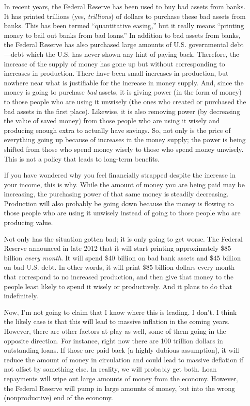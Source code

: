 In recent years, the Federal Reserve has been used to buy bad assets
from banks. It has printed trillions (yes, \textit{trillions}) of
dollars to purchase these bad assets from banks. This has been termed
“quantitative easing,” but it really means “printing money to bail out
banks from bad loans.”  In addition to bad assets from banks, the
Federal Reserve has also purchased large amounts of U.S. governmental
debt—debt which the U.S. has never shown any hint of paying back.
Therefore, the increase of the supply of money has gone up but without
corresponding to increases in production. There have been small
increases in production, but nowhere near what is justifiable for the
increase in money supply. And, since the money is going to purchase
\textit{bad} assets, it is giving power (in the form of money) to those
people who are using it unwisely (the ones who created or purchased the
bad assets in the first place).  Likewise, it is also removing power
(by decreasing the value of saved money) from those people who are
using it wisely and
producing enough extra to actually have
savings.  So, not
only is the price of everything going up because of increases in the
money supply; the power is being shifted from those who spend money
wisely to those who spend money unwisely. This is not a policy that
leads to long-term benefits.

If you have wondered why you feel financially strapped despite the
increase in your income, this is why. While the amount of money you are
being paid may be increasing, the purchasing power of that same money
is steadily decreasing. Production will also probably be going down
because the money is flowing to those people who are using it unwisely
instead of going to those people who are producing value.

Not only has the situation gotten bad; it is only going to get worse.
The Federal Reserve announced in late 2012 that it will start printing
approximately \$85 billion \textit{every month}. It will spend \$40
billion on bad bank assets and \$45 billion on bad U.S. debt. In other
words, it will print \$85 billion dollars every month that correspond
to no increased production, and then give that money to the people
least likely to spend it wisely or productively. And it plans to do
that indefinitely.

Now, I’m not going to claim that I know where this is leading. I don’t.
I think the likely case is that this will lead to massive inflation in
the coming years. 
However, there are other factors at play as well, some of them going in
the opposite direction.  For instance, right now there are 100 trillion
dollars in outstanding loans. If those are paid back (a highly dubious
assumption), it will reduce the amount of money in circulation and could
lead to massive deflation if not offset by
something else.  In reality, we will probably get both. Loan repayments
will wipe out large amounts of money from the economy.  However, the
Federal Reserve will pump in large amounts of money, but into the wrong
(nonproductive) end of the economy.  

